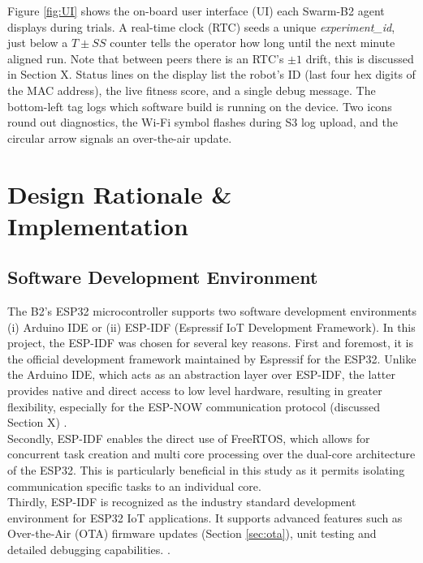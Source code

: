 \documentclass[conference]{IEEEtran}
\begin{document}
Figure \ref{fig:UI} shows the on-board user interface (UI) each Swarm-B2 agent displays during trials. A real-time clock (RTC) seeds a unique \emph{experiment\_id}, just below a $T\pm SS$ counter tells the operator how long until the next minute aligned run. Note that between peers there is an RTC's $\pm1$ drift, this is discussed in Section X. Status lines on the display list the robot's ID (last four hex digits of the MAC address), the live fitness score, and a single debug message. The bottom-left tag logs which software build is running on the device. Two icons round out diagnostics, the Wi-Fi symbol flashes during S3 log upload, and the circular arrow signals an over-the-air update.

\section{Design Rationale \& Implementation}

\subsection{Software Development Environment}
The B2's ESP32 microcontroller supports two software development environments (i) Arduino IDE or (ii) ESP-IDF (Espressif IoT Development Framework). In this project, the ESP-IDF was chosen for several key reasons. First and foremost, it is the official development framework maintained by Espressif for the ESP32. Unlike the Arduino IDE, which acts as an abstraction layer over ESP-IDF, the latter provides native and direct access to low level hardware, resulting in greater flexibility, especially for the ESP-NOW communication protocol (discussed Section X) \cite{esp-boards_esp-idf_nodate}.\\

Secondly, ESP-IDF enables the direct use of FreeRTOS, which allows for concurrent task creation and multi core processing over the dual-core architecture of the ESP32. This is particularly beneficial in this study as it permits isolating communication specific tasks to an individual core.\\ 

Thirdly, ESP-IDF is recognized as the industry standard development environment for ESP32 IoT applications. It supports advanced features such as Over-the-Air (OTA) firmware updates (Section \ref{sec:ota}), unit testing and detailed debugging capabilities. \cite{expressif_freertos_nodate}.
\end{document}
